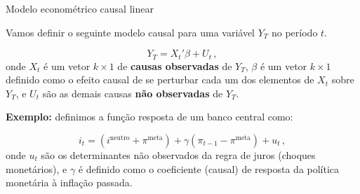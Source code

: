 \documentclass[11pt]{beamer}
\newenvironment{halfwideitemize}{\itemize\addtolength{\itemsep}{0.5em}}{\enditemize}
\begin{document}
	\begin{frame}{Modelo econométrico causal linear}
	\begin{halfwideitemize}
		\item Vamos definir o seguinte modelo causal para uma variável $Y_T$ no período $t$.
		
		$$Y_T = X_t'\beta + U_t \, ,$$
		onde $X_t$ é um vetor $k \times 1$ de \textbf{causas observadas} de $Y_T$, $\beta$ é um vetor $k\times 1$ {\color{orange}definido} como o efeito causal de se perturbar cada um dos elementos de $X_t$ sobre $Y_T$, e $U_t$ são as demais causas \textbf{não observadas} de $Y_T$.
		
		\item \textbf{Exemplo:} definimos a função resposta de um banco central como:
		
		$$i_t = (i^{\text{neutro}} + \pi^{\text{meta}}) + \gamma(\pi_{t-1}-\pi^{\text{meta}}) + u_t \, ,$$
		onde $u_t$ são os determinantes não observados da regra de juros (choques monetários), e $\gamma$ é definido como o coeficiente (causal) de resposta da política monetária à inflação passada.
	
	\end{halfwideitemize}
	\end{frame}
	
\end{document}
